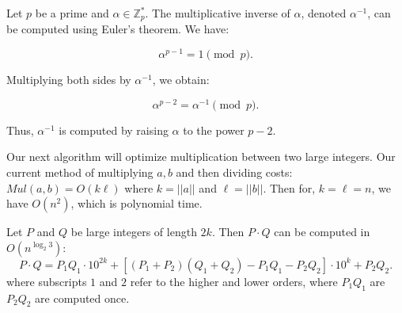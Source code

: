 \begin{theo}

    Let \( p \) be a prime and \( \alpha \in \mathbb{Z}_p^* \). The multiplicative inverse of \( \alpha \), denoted \( \alpha^{-1} \), can be computed using Euler's theorem. We have:

    \[
    \alpha^{p-1} = 1 \pmod{p}.
    \]
    
    \noindent
    Multiplying both sides by \( \alpha^{-1} \), we obtain:

    \[
    \alpha^{p-2} = \alpha^{-1} \pmod{p}.
    \]
    
    \noindent
    Thus, \( \alpha^{-1} \) is computed by raising \( \alpha \) to the power \( p-2 \).
\end{theo}

\noindent
Our next algorithm will optimize multiplication between two large integers. Our current method of multiplying $a,b$ and then dividing costs:
$Mul(a,b)=O(k\ell)$ where $k=||a||$ and $\ell=||b||$. Then for, $k=\ell=n$, we have $O(n^2)$, which is polynomial time. 

\newpage
\begin{theo}

    Let \( P \) and \( Q \) be large integers of length \( 2k \). Then \( P \cdot Q \) can be computed in \( O(n^{\log_2 3}) \):
    \[
    P \cdot Q = P_1 Q_1 \cdot 10^{2k} + \left[ (P_1 + P_2)(Q_1 + Q_2) - P_1 Q_1 - P_2 Q_2 \right] \cdot 10^k + P_2 Q_2.
    \]
    where subscripts \( 1 \) and \( 2 \) refer to the higher and lower orders, where $P_1 Q_1$ are $P_2 Q_2$ are computed once.
\end{theo}

